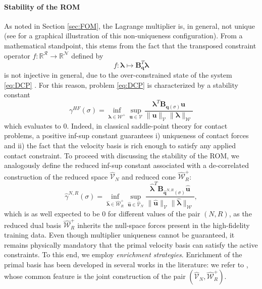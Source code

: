\paragraph{Stability of the ROM}
As noted in Section \ref{sec:FOM}, the Lagrange multiplier is, in general, not unique (see \cite{maury2011discrete} for a graphical illustration of this non-uniqueness configuration). From a mathematical standpoint, this stems from the fact that the transposed constraint operator $f:\mathbb{R}^{\mathcal{R}}\rightarrow \mathbb{R}^{\mathcal{N}}$ defined by 
\[
f:\boldsymbol{\lambda} \mapsto \mathbf{B}_{\mathbf{q}}^T\boldsymbol{\lambda}
\]
is not injective in general, due to the over-constrained state of the system \eqref{eq:DCP} .
For this reason, problem \eqref{eq:DCP} is characterized by a stability constant
\begin{equation}
\gamma^{HF}(\sigma)=\inf_{\boldsymbol{\lambda} \in \mathcal{W}^+} \sup_{\mathbf{u} \in \mathcal V} \frac{\boldsymbol{\lambda}^T\mathbf{B}_{\mathbf{q}(\sigma)}  \mathbf{u}}{\|\mathbf{u}\|_{\mathcal{V}} \|\boldsymbol{\lambda}\|_{\mathcal{W}}}
\label{eq:HF_infsup}
\end{equation}
which evaluates to $0$. Indeed, in classical saddle-point theory for contact problems, a positive inf-sup constant guarantees i) uniqueness of contact forces and ii) the fact that the velocity basis is rich enough to satisfy any applied contact constraint.
To proceed with discussing the stability of the ROM, we analogously define the reduced inf-sup constant associated with a de-correlated construction of the reduced space $\hat{\mathcal{V}}_N$ and reduced cone $\hat{\mathcal{W}}_R^+$:
\begin{equation}
\hat{\gamma}^{N,R}(\sigma)=\inf_{\hat{\boldsymbol{\lambda}} \in \hat{\mathcal{W}}_R^+} \sup_{\hat{\mathbf{u}} \in \hat{\mathcal V}_N} \frac{\hat{\boldsymbol{\lambda}}^T\mathbf{B}_{\hat{\mathbf{q}}^{N,R}(\sigma)}  \hat{\mathbf{u}}}{\|\hat{\mathbf{u}}\|_{\mathcal{V}} \|\hat{\boldsymbol{\lambda}} \|_{\mathcal{W}}},
\label{eq:red_infsup_const}
\end{equation}
which is as well expected to be $0$ for different values of the pair $(N,R)$, as the reduced dual basis $\hat{\mathcal{W}}_R^+$ inherits the null-space forces present in the high-fidelity training data.
Even though multiplier uniqueness cannot be guaranteed, it remains physically mandatory that the primal velocity basis can satisfy the active constraints. To this end, we employ \emph{enrichment strategies}. Enrichment of the primal basis has been developed in several works in the literature: we refer to \cite{rovas2003reduced, rozza2007stability, niakh2023stable,haasdonk2012reduced}, whose common feature is the joint construction of the pair $(\hat{\mathcal{V}}_N,\hat{\mathcal{W}}^{+}_R)$. 
